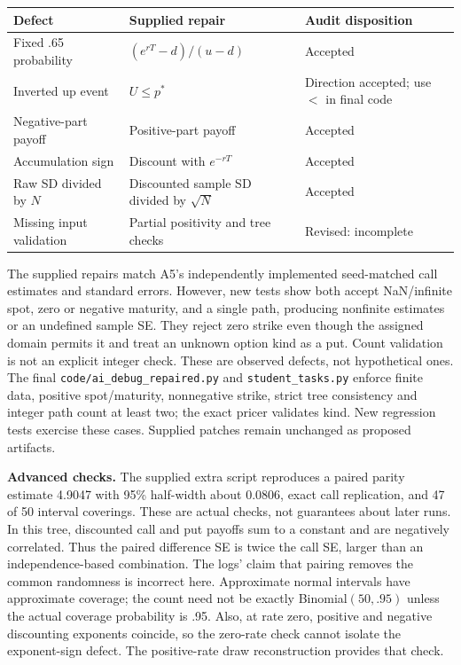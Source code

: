 \begin{center}\small\begin{tabular}{p{.29\linewidth}p{.43\linewidth}p{.2\linewidth}}\toprule
Defect & Supplied repair & Audit disposition\\\midrule
Fixed .65 probability & $(e^{rT}-d)/(u-d)$ & Accepted\\
Inverted up event & $U\leq p^*$ & Direction accepted; use $<$ in final code\\
Negative-part payoff & Positive-part payoff & Accepted\\
Accumulation sign & Discount with $e^{-rT}$ & Accepted\\
Raw SD divided by $N$ & Discounted sample SD divided by $\sqrt N$ & Accepted\\
Missing input validation & Partial positivity and tree checks & Revised: incomplete\\\bottomrule
\end{tabular}\end{center}
The supplied repairs match A5's independently implemented seed-matched call estimates and standard errors. However, new tests show both accept NaN/infinite spot, zero or negative maturity, and a single path, producing nonfinite estimates or an undefined sample SE. They reject zero strike even though the assigned domain permits it and treat an unknown option kind as a put. Count validation is not an explicit integer check. These are observed defects, not hypothetical ones. The final \texttt{code/ai\_debug\_repaired.py} and \texttt{student\_tasks.py} enforce finite data, positive spot/maturity, nonnegative strike, strict tree consistency and integer path count at least two; the exact pricer validates kind. New regression tests exercise these cases. Supplied patches remain unchanged as proposed artifacts.

\textbf{Advanced checks.} The supplied extra script reproduces a paired parity estimate 4.9047 with 95\% half-width about 0.0806, exact call replication, and 47 of 50 interval coverings. These are actual checks, not guarantees about later runs. In this tree, discounted call and put payoffs sum to a constant and are negatively correlated. Thus the paired difference SE is twice the call SE, larger than an independence-based combination. The logs' claim that pairing removes the common randomness is incorrect here. Approximate normal intervals have approximate coverage; the count need not be exactly Binomial$(50,.95)$ unless the actual coverage probability is .95. Also, at rate zero, positive and negative discounting exponents coincide, so the zero-rate check cannot isolate the exponent-sign defect. The positive-rate draw reconstruction provides that check.

